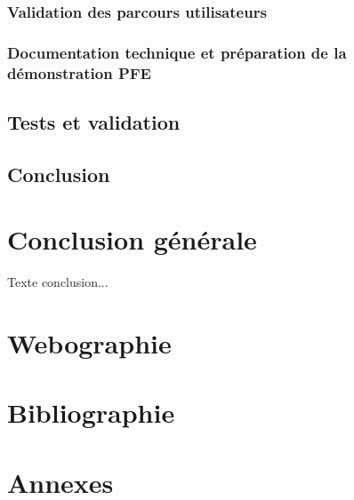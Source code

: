 \documentclass[12pt,a4paper]{report}
\begin{document}
\subsection{Validation des parcours utilisateurs}
\subsection{Documentation technique et préparation de la démonstration PFE}
\section{Tests et validation}
\section{Conclusion}


\chapter*{Conclusion générale}

Texte conclusion...


\chapter*{Webographie}


\chapter*{Bibliographie}


\chapter*{Annexes}
\end{document}
